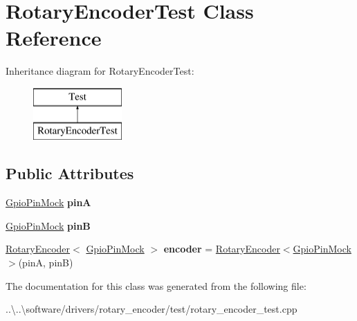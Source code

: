 \hypertarget{class_rotary_encoder_test}{}\section{Rotary\+Encoder\+Test Class Reference}
\label{class_rotary_encoder_test}
Inheritance diagram for Rotary\+Encoder\+Test\+:\begin{figure}[H]
\begin{center}
\leavevmode
\includegraphics[height=2.000000cm]{class_rotary_encoder_test}
\end{center}
\end{figure}
\subsection*{Public Attributes}
\begin{DoxyCompactItemize}
\item 
\mbox{\label{class_rotary_encoder_test_a8079cd19d6660966a63c83257a9bab2f}} 
\mbox{\hyperlink{class_gpio_pin_mock}{Gpio\+Pin\+Mock}} {\bfseries pinA}
\item 
\mbox{\label{class_rotary_encoder_test_af7150e74ea15ac798ff338d228e36995}} 
\mbox{\hyperlink{class_gpio_pin_mock}{Gpio\+Pin\+Mock}} {\bfseries pinB}
\item 
\mbox{\label{class_rotary_encoder_test_a88efb9449b23f19dba25f6e7e960b900}} 
\mbox{\hyperlink{class_rotary_encoder}{Rotary\+Encoder}}$<$ \mbox{\hyperlink{class_gpio_pin_mock}{Gpio\+Pin\+Mock}} $>$ {\bfseries encoder} = \mbox{\hyperlink{class_rotary_encoder}{Rotary\+Encoder}}$<$\mbox{\hyperlink{class_gpio_pin_mock}{Gpio\+Pin\+Mock}}$>$(pinA, pinB)
\end{DoxyCompactItemize}


The documentation for this class was generated from the following file\+:\begin{DoxyCompactItemize}
\item 
..\textbackslash{}..\textbackslash{}software/drivers/rotary\+\_\+encoder/test/rotary\+\_\+encoder\+\_\+test.\+cpp\end{DoxyCompactItemize}
